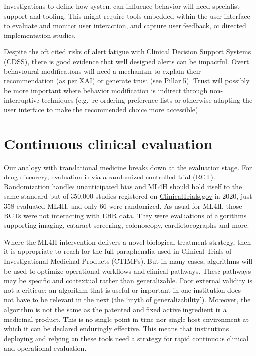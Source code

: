 Investigations to define how system can influence behavior will need
specialist support and tooling. This might require tools embedded within
the user interface to evaluate and monitor user interaction, and capture
user feedback\citep{yusop2017}, or directed implementation
studies.\citep{sutton2020}

Despite the oft cited risks of alert fatigue with Clinical Decision
Support Systems (CDSS)\citep{phansalkar2013}, there is good evidence
that well designed alerts can be
impactful.\citep{park2022, sayres2019, main2010} Overt behavioural
modifications will need a mechanism to explain their recommendation (as
per XAI) or generate trust (see Pillar 5).\citep{mccoy2022} Trust will
possibly be more important where behavior modification is indirect
through non-interruptive techniques (e.g.~re-ordering preference lists
or otherwise adapting the user interface to make the recommended choice
more accessible).

\hypertarget{continuous-clinical-evaluation}{%
\section{Continuous clinical
evaluation}\label{continuous-clinical-evaluation}}

Our analogy with translational medicine breaks down at the evaluation
stage. For drug discovery, evaluation is via a randomized controlled
trial (RCT). Randomization handles unanticipated bias and ML4H should
hold itself to the same standard but of 350,000 studies registered on
\url{ClinicalTrials.gov} in 2020, just 358 evaluated ML4H, and only 66
were randomized.\citep{zippel2021} As usual for ML4H, those RCTs were
not interacting with EHR data. They were evaluations of algorithms
supporting imaging, cataract screening, colonoscopy, cardiotocographs
and
more.\citep{infant2017, titano2018, wang2019, wu2019, lin2019a, turakhia2019a, long2017}

Where the ML4H intervention delivers a novel biological treatment
strategy, then it is appropriate to reach for the full paraphenalia used
in Clinical Trials of Investigational Medicinal Products
(CTIMPs).\citep{komorowski2018} But in many cases, algorithms will be
used to optimize operational workflows and clinical pathways. These
pathways may be specific and contextual rather than generalizable. Poor
external validity is not a critique: an algorithm that is useful or
important in one institution does not have to be relevant in the next
(the `myth of generalizability').\citep{futoma2020} Moreover, the
algorithm is not the same as the patented and fixed active ingredient in
a medicinal product. This is no single point in time nor single host
environment at which it can be declared enduringly effective. This means
that institutions deploying and relying on these tools need a strategy
for rapid continuous clinical and operational evaluation.

